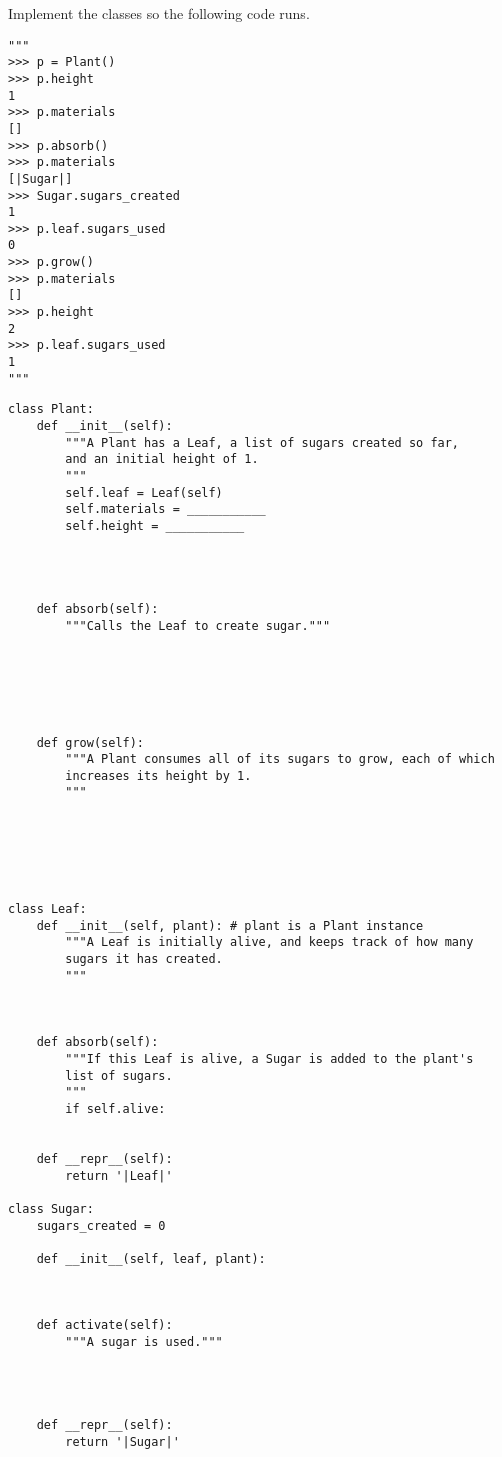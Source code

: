 \begin{blocksection}
\question Implement the classes so the following code runs.

\begin{lstlisting}
"""
>>> p = Plant()
>>> p.height
1
>>> p.materials
[]
>>> p.absorb()
>>> p.materials
[|Sugar|]
>>> Sugar.sugars_created
1
>>> p.leaf.sugars_used
0
>>> p.grow()
>>> p.materials
[]
>>> p.height
2
>>> p.leaf.sugars_used
1
"""
\end{lstlisting}
\end{blocksection}

\ifprintanswers\else
\begin{lstlisting}
class Plant:
    def __init__(self):
        """A Plant has a Leaf, a list of sugars created so far,
        and an initial height of 1.
        """
        self.leaf = Leaf(self)
        self.materials = ___________
        self.height = ___________




    def absorb(self):
        """Calls the Leaf to create sugar."""






    def grow(self):
        """A Plant consumes all of its sugars to grow, each of which
        increases its height by 1.
        """






class Leaf:
    def __init__(self, plant): # plant is a Plant instance
        """A Leaf is initially alive, and keeps track of how many
        sugars it has created.
        """



    def absorb(self):
        """If this Leaf is alive, a Sugar is added to the plant's
        list of sugars.
        """
        if self.alive:


    def __repr__(self):
        return '|Leaf|'

class Sugar:
    sugars_created = 0

    def __init__(self, leaf, plant):



    def activate(self):
        """A sugar is used."""




    def __repr__(self):
        return '|Sugar|'
\end{lstlisting}
\fi

